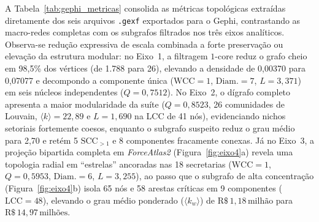 A Tabela~\ref{tab:gephi_metricas} consolida as métricas topológicas extraídas diretamente dos seis arquivos \texttt{.gexf} exportados para o Gephi, contrastando as macro-redes completas com os subgrafos filtrados nos três eixos analíticos. Observa-se redução expressiva de escala combinada a forte preservação ou elevação da estrutura modular: no Eixo~1, a filtragem $1$-core reduz o grafo cheio em 98,5\% dos vértices (de 1.788 para 26), elevando a densidade de 0,00370 para 0,07077 e decompondo a componente única ($\text{WCC}=1$, $\text{Diam.}=7$, $L=3{,}371$) em seis núcleos independentes ($Q=0{,}7512$). No Eixo~2, o dígrafo completo apresenta a maior modularidade da suíte ($Q=0{,}8523$, 26 comunidades de Louvain, $\langle k \rangle=22{,}89$ e $L=1{,}690$ na LCC de 41 nós), evidenciando nichos setoriais fortemente coesos, enquanto o subgrafo suspeito reduz o grau médio para 2,70 e retém 5 $\text{SCC}_{>1}$ e 8 componentes fracamente conexas. Já no Eixo~3, a projeção bipartida completa em \textit{ForceAtlas2} (Figura~\ref{fig:eixo4}a) revela uma topologia radial em ``estrelas'' ancoradas nas 18 secretarias ($\text{WCC}=1$, $Q=0{,}5953$, $\text{Diam.}=6$, $L=3{,}255$), ao passo que o subgrafo de alta concentração (Figura~\ref{fig:eixo4}b) isola 65 nós e 58 arestas críticas em 9 componentes ($\text{LCC}=48$), elevando o grau médio ponderado ($\langle k_w \rangle$) de $\text{R\$}\,1{,}18\,\text{milhão}$ para $\text{R\$}\,14{,}97\,\text{milhões}$.

